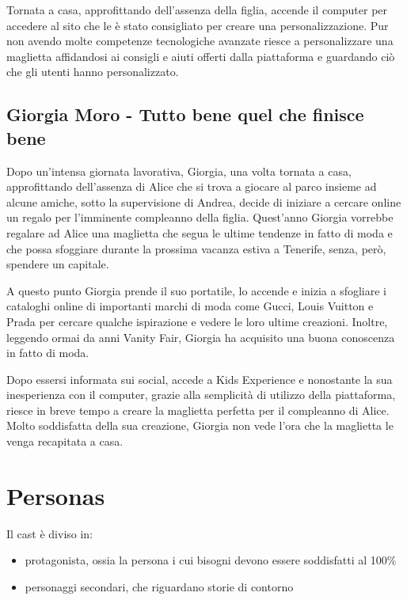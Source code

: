 \documentclass[12pt,italian,]{report}
\providecommand{\tightlist}{%
  \setlength{\itemsep}{0pt}\setlength{\parskip}{0pt}}
\begin{document}
Tornata a casa, approfittando dell'assenza della figlia, accende il
computer per accedere al sito che le è stato consigliato per creare una
personalizzazione. Pur non avendo molte competenze tecnologiche avanzate
riesce a personalizzare una maglietta affidandosi ai consigli e aiuti
offerti dalla piattaforma e guardando ciò che gli utenti hanno
personalizzato.

\hypertarget{giorgia-moro---tutto-bene-quel-che-finisce-bene}{%
\subsection{Giorgia Moro - Tutto bene quel che finisce
bene}\label{giorgia-moro---tutto-bene-quel-che-finisce-bene}}

Dopo un'intensa giornata lavorativa, Giorgia, una volta tornata a casa,
approfittando dell'assenza di Alice che si trova a giocare al parco
insieme ad alcune amiche, sotto la supervisione di Andrea, decide di
iniziare a cercare online un regalo per l'imminente compleanno della
figlia. Quest'anno Giorgia vorrebbe regalare ad Alice una maglietta che
segua le ultime tendenze in fatto di moda e che possa sfoggiare durante
la prossima vacanza estiva a Tenerife, senza, però, spendere un
capitale.

A questo punto Giorgia prende il suo portatile, lo accende e inizia a
sfogliare i cataloghi online di importanti marchi di moda come Gucci,
Louis Vuitton e Prada per cercare qualche ispirazione e vedere le loro
ultime creazioni. Inoltre, leggendo ormai da anni Vanity Fair, Giorgia
ha acquisito una buona conoscenza in fatto di moda.

Dopo essersi informata sui social, accede a Kids Experience e nonostante
la sua inesperienza con il computer, grazie alla semplicità di utilizzo
della piattaforma, riesce in breve tempo a creare la maglietta perfetta
per il compleanno di Alice. Molto soddisfatta della sua creazione,
Giorgia non vede l'ora che la maglietta le venga recapitata a casa.

\hypertarget{personas}{%
\section{Personas}\label{personas}}

Il cast è diviso in:

\begin{itemize}
\tightlist
\item
  protagonista, ossia la persona i cui bisogni devono essere soddisfatti
  al 100\%
\item
  personaggi secondari, che riguardano storie di contorno
\end{itemize}
\end{document}
